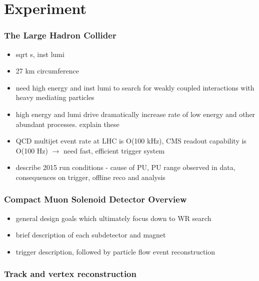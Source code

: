 \chapter{Experiment}
\label{experiment_chapter}
\subsection{The Large Hadron Collider}
\begin{itemize}
	\item sqrt s, inst lumi
	\item 27 km circumference
	\item need high energy and inst lumi to search for weakly coupled interactions with heavy mediating particles
	\item high energy and lumi drive dramatically increase rate of low energy and other abundant processes. explain these
	\item QCD multijet event rate at LHC is O(100 kHz), CMS readout capability is O(100 Hz) $\rightarrow$ need fast, efficient trigger system
	\item describe 2015 run conditions - cause of PU, PU range observed in data, consequences on trigger, offline reco and analysis
\end{itemize}


\subsection{Compact Muon Solenoid Detector Overview}
\begin{itemize}
	\item general design goals which ultimately focus down to WR search
	\item brief description of each subdetector and magnet
	\item trigger description, followed by particle flow event reconstruction
\end{itemize}

\subsection{Track and vertex reconstruction}

